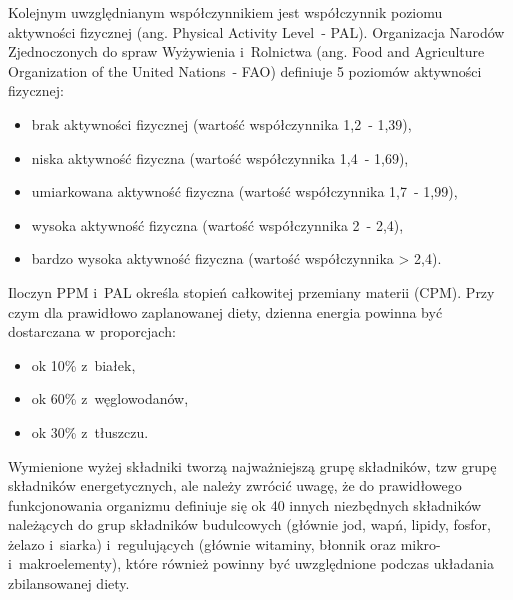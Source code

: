 \par
Kolejnym uwzględnianym współczynnikiem jest współczynnik poziomu aktywności fizycznej (ang. Physical Activity Level~- PAL).
Organizacja Narodów Zjednoczonych do spraw Wyżywienia i~Rolnictwa (ang. Food and Agriculture Organization of the United Nations~- FAO) definiuje 5 poziomów aktywności fizycznej\cite{url:fao-pal}:
\begin{itemize}
    \item brak aktywności fizycznej (wartość współczynnika 1,2~- 1,39),
    \item niska aktywność fizyczna (wartość współczynnika 1,4~- 1,69),
    \item umiarkowana aktywność fizyczna (wartość współczynnika 1,7~- 1,99),
    \item wysoka aktywność fizyczna (wartość współczynnika 2~- 2,4),
    \item bardzo wysoka aktywność fizyczna (wartość współczynnika > 2,4).
\end{itemize}

\par
Iloczyn PPM i~PAL określa stopień całkowitej przemiany materii (CPM)\cite{book:normy-zywienia-czlowieka}.
Przy czym dla prawidłowo zaplanowanej diety, dzienna energia powinna być dostarczana w proporcjach:
\begin{itemize}
    \item ok 10\% z~białek,
    \item ok 60\% z~węglowodanów,
    \item ok 30\% z~tłuszczu.
\end{itemize}

Wymienione wyżej składniki tworzą najważniejszą grupę składników, tzw grupę składników energetycznych, ale należy zwrócić uwagę,
że do prawidłowego funkcjonowania organizmu definiuje się ok 40 innych niezbędnych składników należących do grup składników budulcowych
(głównie jod, wapń, lipidy, fosfor, żelazo i~siarka) i~regulujących (głównie witaminy, błonnik oraz mikro- i~makroelementy),
które również powinny być uwzględnione podczas układania zbilansowanej diety\cite{book:dietetyka-zywienie-zdrowego-i-chorego-czlowieka}.

